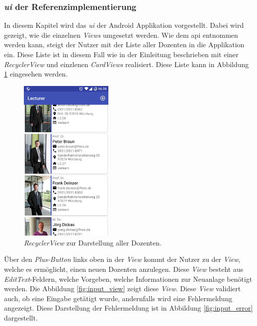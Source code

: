 \subsubsection{\textit{\acf{ui}} der Referenzimplementierung}
In diesem Kapitel wird das \textit{\acl{ui}} der Android Applikation vorgestellt. Dabei wird gezeigt, wie die einzelnen \textit{Views} umgesetzt werden.
Wie dem \acl{api} entnommen werden kann, steigt der Nutzer mit der Liste aller Dozenten in die Applikation ein. Diese Liste ist in diesem Fall wie in der Einleitung beschrieben mit einer \textit{RecyclerView} und einzlenen \textit{CardViews} realisiert. Diese Liste kann in Abbildung \ref{fig:list} eingesehen werden.

\begin{figure}[H]
	\begin{center}
		\includegraphics[width=0.4\textwidth]{images/list.png}
		\caption{\textit{RecyclerView} zur Darstellung aller Dozenten.}
		\label{fig:list}
	\end{center}
\end{figure}

Über den \textit{Plus-Button} links oben in der \textit{View} kommt der Nutzer zu der \textit{View}, welche es ermöglicht, einen neuen Dozenten anzulegen. Diese \textit{View} besteht aus \textit{EditText}-Feldern, welche Vorgeben, welche Informationen zur Neuanlage benötigt werden. Die Abbildung \ref{fig:input_view} zeigt diese \textit{View}. Diese \textit{View} validiert auch, ob eine Eingabe getätigt wurde, andernfalls wird eine Fehlermeldung angezeigt. Diese Darstellung der Fehlermeldung ist in Abbildung \ref{fig:input_error} dargestellt.

